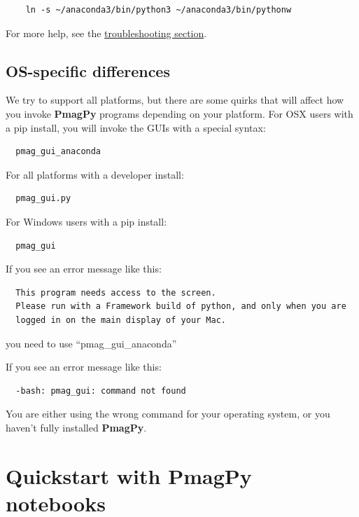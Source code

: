 \documentclass[11pt]{book}
\begin{document}
{\begin{itemize}
\begin{verbatim}
    ln -s ~/anaconda3/bin/python3 ~/anaconda3/bin/pythonw

    \end{verbatim}

\end{itemize}

For more help, see the \href{#trouble}{troubleshooting section}.

    \subsection {OS-specific differences}
    We try to support all platforms, but there are some quirks that will affect how you invoke {\bf PmagPy} programs depending on your platform.  For OSX users with a pip install, you will invoke the GUIs with a special syntax:

\begin{verbatim}
  pmag_gui_anaconda
\end{verbatim}

For all platforms with a developer install:

\begin{verbatim}
  pmag_gui.py
\end{verbatim}

For Windows users with a pip install:

\begin{verbatim}
  pmag_gui
\end{verbatim}


If you see an error message like this:

\begin{verbatim}
  This program needs access to the screen.
  Please run with a Framework build of python, and only when you are
  logged in on the main display of your Mac.
\end{verbatim}

you need to use ``pmag\_gui\_anaconda''

If you see an error message like this:

\begin{verbatim}
  -bash: pmag_gui: command not found
\end{verbatim}

You are either using the wrong command for your operating system, or you haven't fully installed {\bf PmagPy}.



\section{Quickstart with PmagPy notebooks}

}
\end{document}
